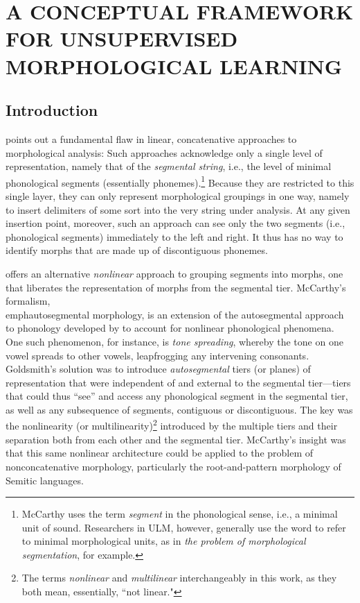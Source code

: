 \chapter{A CONCEPTUAL FRAMEWORK FOR UNSUPERVISED MORPHOLOGICAL LEARNING}
\label{ch:lit-review}

\section{Introduction}
\label{sec:framework-intro}
\cite{mccarthy:1981} points out a fundamental flaw in linear, 
concatenative approaches to morphological analysis: 
Such approaches acknowledge only a single level of representation, 
namely that of the \emph{segmental string}, i.e., the level of minimal 
phonological segments (essentially phonemes).\footnote{McCarthy uses
 the term \emph{segment} in the phonological sense, i.e., a minimal unit of sound. 
Researchers in \ac{ULM}, however, generally use the word to 
refer to minimal morphological units, 
as in \textit{the problem of morphological segmentation}, for example.}  
Because they are restricted to this single layer, they can only represent 
morphological groupings in one way, namely to insert delimiters of 
some sort 
into the very string under analysis. At any given
insertion point, moreover, such an approach can see only the two segments 
(i.e., phonological segments) immediately to the left and right. It thus
has no way to identify morphs that are made up of discontiguous phonemes.

\cite{mccarthy:1981} offers an alternative \emph{nonlinear} 
approach to grouping segments into morphs, one that liberates the 
representation of morphs from the segmental tier. McCarthy's formalism, 
\\emph{autosegmental morphology}, is an extension of the autosegmental 
approach to phonology developed by \citep{goldsmith:1976} to account 
for nonlinear phonological phenomena. One such phenomenon, for instance, 
is \emph{tone spreading}, whereby the tone on one vowel spreads to other 
vowels, leapfrogging any intervening consonants. 
Goldsmith's solution was to introduce \emph{autosegmental} tiers 
(or planes) of representation that were independent of and external 
to the segmental tier---tiers that could thus ``see'' and access any 
phonological segment in the segmental tier, as well as any subsequence 
of segments, contiguous or discontiguous. The key was the nonlinearity 
(or multilinearity)\footnote{The terms \emph{nonlinear} and \emph{multilinear} 
interchangeably in this work, as they both mean, essentially, ``not linear."}
introduced by the multiple tiers and their separation both from each other 
and the segmental tier. 
McCarthy's insight was that this same nonlinear architecture could be 
applied to the problem of nonconcatenative morphology, particularly the 
root-and-pattern morphology of Semitic languages. 

